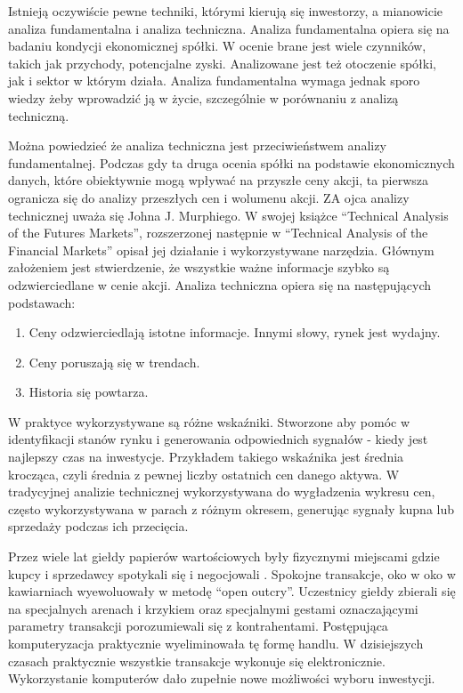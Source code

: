 \documentclass[twoside]{iisthesis}
\begin{document}
Istnieją oczywiście pewne techniki, którymi kierują się inwestorzy, a mianowicie analiza fundamentalna i analiza techniczna. Analiza fundamentalna opiera się na badaniu kondycji ekonomicznej spółki. W ocenie brane jest wiele czynników, takich jak przychody, potencjalne zyski. Analizowane jest też otoczenie spółki, jak i sektor w którym działa. Analiza fundamentalna wymaga jednak sporo wiedzy żeby wprowadzić ją w życie, szczególnie w porównaniu z analizą techniczną.

Można powiedzieć że analiza techniczna jest przeciwieństwem analizy fundamentalnej. Podczas gdy ta druga ocenia spółki na podstawie ekonomicznych danych, które obiektywnie mogą wpływać na przyszłe ceny akcji, ta pierwsza ogranicza się do analizy przeszłych cen i wolumenu akcji. ZA ojca analizy technicznej uważa się Johna J. Murphiego. W swojej książce ``Technical Analysis of the Futures Markets'', rozszerzonej następnie w ``Technical Analysis of the Financial Markets''  \cite{Murphy} opisał jej działanie i wykorzystywane narzędzia. Głównym założeniem jest stwierdzenie, że wszystkie ważne informacje szybko są odzwierciedlane w cenie akcji. Analiza techniczna opiera się na następujących podstawach:

\begin{enumerate}
\item Ceny odzwierciedlają istotne informacje. Innymi słowy, rynek jest wydajny.
\item Ceny poruszają się w trendach.
\item Historia się powtarza.
\end{enumerate}

W praktyce wykorzystywane są różne wskaźniki. Stworzone aby pomóc w identyfikacji stanów rynku i generowania odpowiednich sygnałów - kiedy jest najlepszy czas na inwestycje. Przykładem takiego wskaźnika jest średnia krocząca, czyli średnia z pewnej liczby ostatnich cen danego aktywa. W tradycyjnej analizie technicznej wykorzystywana do wygładzenia wykresu cen, często wykorzystywana w parach z różnym okresem, generując sygnały kupna lub sprzedaży podczas ich przecięcia.

Przez wiele lat giełdy papierów wartościowych były fizycznymi miejscami gdzie kupcy i sprzedawcy spotykali się i negocjowali \cite{openOutcry}. Spokojne transakcje, oko w oko w kawiarniach wyewoluowały w metodę ``open outcry''. Uczestnicy giełdy zbierali się na specjalnych arenach i krzykiem oraz specjalnymi gestami oznaczającymi parametry transakcji porozumiewali się z kontrahentami. Postępująca komputeryzacja praktycznie wyeliminowała tę formę handlu. W dzisiejszych czasach praktycznie wszystkie transakcje wykonuje się elektronicznie. Wykorzystanie komputerów dało zupełnie nowe możliwości wyboru inwestycji. 
\end{document}
